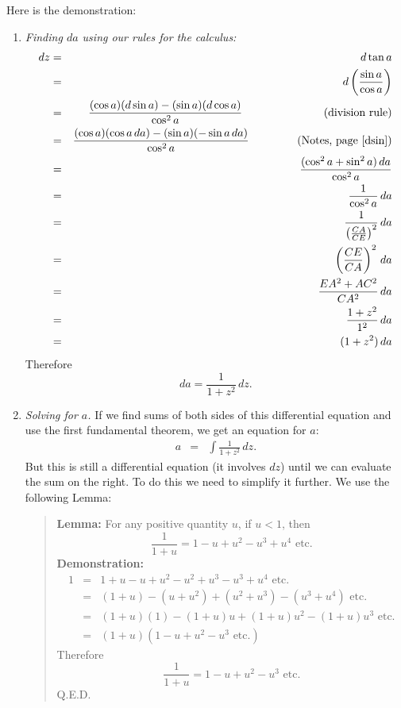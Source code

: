 \documentclass[polutonikogreek,english,twoside,openright]{article}
\begin{document}
Here is the demonstration:
\begin{enumerate}
\item {\em Finding $da$ using our rules for the calculus:}
  \setlength{\jot}{2ex}
  \begin{eqnarray*}
    dz & = & d\tan a \\
       & = & d\left(\frac{\sin a}{\cos a}\right) \\
       & = & \frac{(\cos a)(d\sin a) - (\sin a)(d\cos a)}{\cos^2 a}\mbox{\hspace{7em} (division rule)}\\
       & = & \frac{(\cos a)(\cos a\,da) - (\sin a)(-\sin
             a\,da)}{\cos^2 a}\mbox{\hspace{4em} (Notes,
             page~\pageref{dsin})}\\ 
       & = & \frac{(\cos^2 a + \sin^2 a)\,da}{\cos^2 a} \\
       & = & \frac{1}{\cos^2 a}\,da\\
       & = & \frac{1}{\left(\frac{CA}{CE}\right)^2}\,da\\
       & = & \left(\frac{CE}{CA}\right)^2\,da\\
       & = & \frac{EA^2 + AC^2}{CA^2}\,da\\
       & = & \frac{1+z^2}{1^2}\,da\\
       & = & (1+z^2)\,da
  \end{eqnarray*}
  Therefore
$$da = \frac{1}{1+z^2}\,dz.$$

\item {\em Solving for $a$.} If we find sums of both sides of this
  differential equation and use the first fundamental theorem, we get
  an equation for $a$: \setcounter{equation}{0}
  \begin{eqnarray}
    \label{ainteq} a &  = & \int\!\frac{1}{1 + z^2}\,dz.
  \end{eqnarray}
  But this is still a differential equation (it involves $dz$) until
  we can evaluate the sum on the right.  To do this we need to
  simplify it further.  We use the following Lemma:
  \begin{quote} {\bf Lemma:}\label{sumlemma} For any positive quantity
    $u$, if $u<1$, then
$$\frac{1}{1+ u} = 1 - u + u^2 - u^3 + u^4 \mbox{ etc.}$$
{\bf Demonstration:} \setlength{\jot}{1.5ex}
\begin{eqnarray*}
  1 & =  & 1 + u - u + u^2 - u^2  +u^3 - u^3 + u^4 \mbox{ etc.}\\
    & = & (1+u) - (u+ u^2) + (u^2 + u^3) - (u^3 + u^4) \mbox{ etc.}\\
    & = & (1+u)(1) - (1+u)u + (1+u)u^2 - (1+u)u^3 \mbox{ etc.}\\
    & = & (1+u)(1 - u + u^2 -u^3 \mbox{ etc.})
\end{eqnarray*}
Therefore
 $$\frac{1}{1+u} = 1 -u +u^2 - u^3 \mbox{ etc.}$$
 Q.E.D.


\end{quote}
\end{enumerate}
\end{document}
